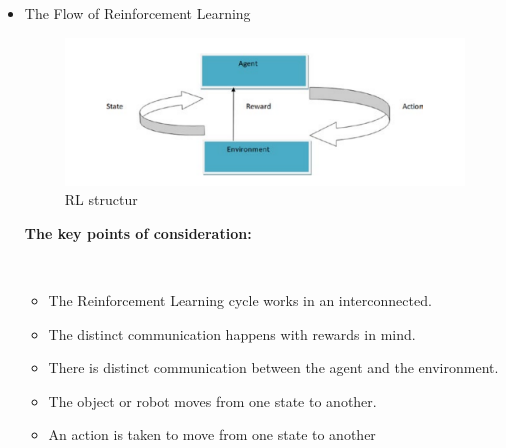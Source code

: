 \documentclass[14pt,a4paper]{report}  %
\begin{document}
\begin{itemize}
\item The Flow of Reinforcement Learning\\
\begin{figure}[hbt!]
\begin{center}
\includegraphics[scale=0.74]{The_Flow_of_Reinforcement_Learning}
\caption{RL structur}
\end{center}
\end{figure}
\begin{large}
\textbf{The key points of consideration:}
\end{large}\\
\begin{itemize}
\item The Reinforcement Learning cycle works in an interconnected. 
\end{itemize}

\begin{itemize}
\item The distinct communication happens with rewards in mind.
\end{itemize}
\begin{itemize}
\item There is distinct communication between the agent and the 
environment. 
 
\end{itemize}
\begin{itemize}
\item The object or robot moves from one state to another. 
 
\end{itemize}
\begin{itemize}
\item An action is taken to move from one state to another 
\end{itemize}


\end{itemize}
\end{document}
